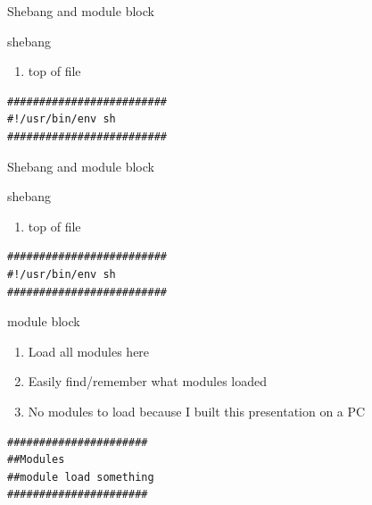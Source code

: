 \documentclass[t,10pt]{beamer}
\begin{document}
\begin{frame}[fragile,label={sec:orgheadline20}]{Shebang and module block}
 \begin{block}{shebang}
\begin{enumerate}
\item top of file
\end{enumerate}
\lstset{language=sh,label= ,caption= ,captionpos=b,numbers=none}
\begin{lstlisting}
#########################
#!/usr/bin/env sh
#########################
\end{lstlisting}
\end{block}
\end{frame}

\begin{frame}[fragile,label={sec:orgheadline21}]{Shebang and module block}
 \begin{block}{shebang}
\begin{enumerate}
\item top of file
\end{enumerate}
\lstset{language=sh,label= ,caption= ,captionpos=b,numbers=none}
\begin{lstlisting}
#########################
#!/usr/bin/env sh
#########################
\end{lstlisting}
\end{block}
\begin{block}{module block}
\begin{enumerate}
\item Load all modules here
\item Easily find/remember what modules loaded
\item No modules to load because I built this presentation on a PC
\end{enumerate}
\lstset{language=sh,label= ,caption= ,captionpos=b,numbers=none}
\begin{lstlisting}
######################
##Modules
##module load something
######################
\end{lstlisting}
\end{block}
\end{frame}
\end{document}
